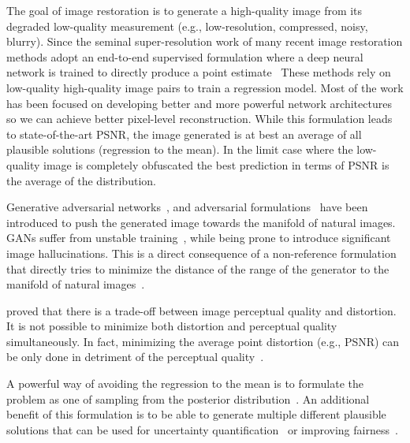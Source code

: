 \documentclass[10pt]{article} %
\begin{document}
\label{sec:related_work}
The goal of image restoration is to generate a high-quality image from its degraded low-quality measurement (e.g., low-resolution, compressed, noisy, blurry). Since the seminal super-resolution work of \citet{dong2015image} many recent image restoration methods adopt an end-to-end supervised formulation where a deep neural network is trained to directly produce a point estimate~\citep{zhao2016loss,lim2017enhanced,tao2018scale,chen2018learning}
These methods rely on low-quality high-quality image pairs to train a regression model. Most of the work has been focused on developing better and more powerful network architectures~\citep{zamir2022restormer,chen2022simple,tu2022maxim,zamir2021multi} so we can achieve better pixel-level reconstruction. While this formulation leads to state-of-the-art PSNR, the image generated is at best an average of all plausible solutions (regression to the mean). In the limit case where the low-quality image is completely obfuscated  the best prediction in terms of PSNR is the average of the distribution.

Generative adversarial networks~\citep{goodfellow2014generative,arjovsky2017wasserstein}, and adversarial formulations~\citep{ledig2017photo,isola2017image,kupyn2018deblurgan,kupyn2019deblurgan} have been introduced to push the generated image towards the manifold of natural images. GANs suffer from unstable training~\citep{arora2017generalization,salimans2016improved,arjovsky2017wasserstein}, while being prone to introduce significant image hallucinations. This is a direct consequence of a non-reference formulation that directly tries to minimize the distance of the range of the generator to the manifold of natural images~\citep{cohen2018distribution}.

\citet{blau2018perception} proved that there is a trade-off between image perceptual quality and distortion. It is not possible to minimize both distortion and perceptual quality simultaneously. In fact, minimizing the average point distortion (e.g., PSNR) can be only done in detriment of the perceptual quality~\citep{blau2018perception, freirich2021theory}. 

A powerful way of avoiding the regression to the mean is to formulate the problem as one of sampling from the posterior distribution~\citep{kawar2021stochastic,kawar2021snips,kawar2022denoising,ohayon2021high,kadkhodaie2021stochastic,whang2022deblurring}. An additional benefit of this formulation is to be able to generate multiple different plausible solutions that can be used for uncertainty quantification~\citep{whang2021composing} or improving fairness~\citep{jalal2021fairness}.
\end{document}
